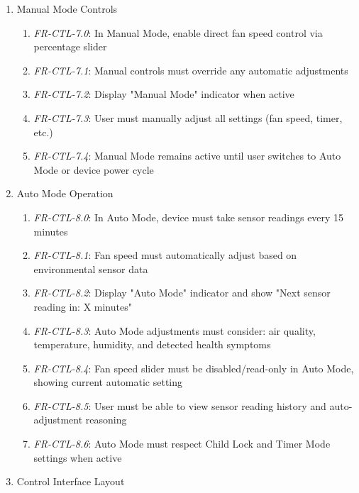 \documentclass[conference]{IEEEtran}
\begin{document}
\begin{enumerate}
                    \item Manual Mode Controls
                        \begin{enumerate}
                            \item \textit{FR-CTL-7.0}: In Manual Mode, enable direct fan speed control via percentage slider
                            \item \textit{FR-CTL-7.1}: Manual controls must override any automatic adjustments
                            \item \textit{FR-CTL-7.2}: Display "Manual Mode" indicator when active
                            \item \textit{FR-CTL-7.3}: User must manually adjust all settings (fan speed, timer, etc.)
                            \item \textit{FR-CTL-7.4}: Manual Mode remains active until user switches to Auto Mode or device power cycle
                        \end{enumerate}                
                    \item Auto Mode Operation
                        \begin{enumerate}
                            \item \textit{FR-CTL-8.0}: In Auto Mode, device must take sensor readings every 15 minutes
                            \item \textit{FR-CTL-8.1}: Fan speed must automatically adjust based on environmental sensor data
                            \item \textit{FR-CTL-8.2}: Display "Auto Mode" indicator and show "Next sensor reading in: X minutes"
                            \item \textit{FR-CTL-8.3}: Auto Mode adjustments must consider: air quality, temperature, humidity, and detected health symptoms
                            \item \textit{FR-CTL-8.4}: Fan speed slider must be disabled/read-only in Auto Mode, showing current automatic setting
                            \item \textit{FR-CTL-8.5}: User must be able to view sensor reading history and auto-adjustment reasoning
                            \item \textit{FR-CTL-8.6}: Auto Mode must respect Child Lock and Timer Mode settings when active
                        \end{enumerate}
                    \item Control Interface Layout

\end{enumerate}
\end{document}
